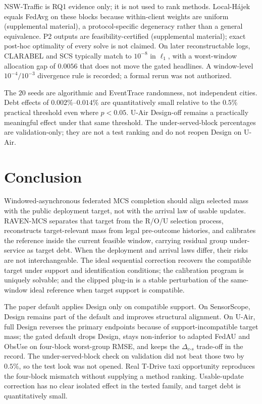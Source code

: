 \documentclass[letterpaper,journal]{IEEEtran}
\begin{document}
NSW-Traffic is RQ1 evidence only; it is not used to rank methods.
Local-H\'ajek equals FedAvg on these blocks because within-client
weights are uniform (supplemental material), a
protocol-specific degeneracy rather than a general equivalence.
P2 outputs are feasibility-certified
(supplemental material); exact post-hoc optimality of every
solve is not claimed.  On later reconstructable logs, CLARABEL and SCS
typically match to $10^{-8}$ in $\ell_1$, with a worst-window
allocation gap of $0.0056$ that does not move the gated headlines.  A window-level $10^{-4}/10^{-3}$ divergence rule is
recorded; a formal rerun was not authorized.

The $20$ seeds are algorithmic and EventTrace randomness, not
independent cities.  Debt effects of $0.002\%$--$0.014\%$ are
quantitatively small relative to the $0.5\%$ practical threshold even
where $p<0.05$.  U-Air Design-off remains a practically meaningful
effect under that same threshold.  The under-served-block percentages
are validation-only; they are not a test ranking and do not reopen
Design on U-Air.


\section{Conclusion}
\label{sec:conclusion}

Windowed-asynchronous federated MCS completion should align selected
mass with the public deployment target, not with the arrival law of
usable updates.  RAVEN-MCS separates that target from the R/O/U
selection process, reconstructs target-relevant mass from legal
pre-outcome histories, and calibrates the reference inside the current
feasible window, carrying residual group under-service as target debt.
When the deployment and arrival laws differ, their risks are not
interchangeable.  The ideal sequential correction recovers the
compatible target under support and identification conditions; the
calibration program is uniquely solvable; and the clipped plug-in is a
stable perturbation of the same-window ideal reference when target
support is compatible.

The paper default applies Design only on compatible support.  On
SensorScope, Design remains part of the default and improves structural
alignment.  On U-Air, full Design reverses the primary endpoints
because of support-incompatible target mass; the gated default drops
Design, stays non-inferior to adapted FedAU and ObsUse on four-block
worst-group RMSE, and keeps the $\Delta_{c\text{-}s}$ trade-off in the
record.  The under-served-block check on validation did not beat those
two by $0.5\%$, so the test look was not opened.  Real T-Drive taxi
opportunity reproduces the four-block
mismatch without supplying a method ranking.  Usable-update correction
has no clear isolated effect in the tested family, and target debt is
quantitatively small.
\end{document}
